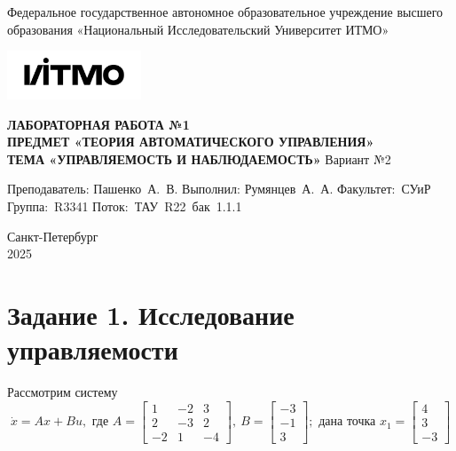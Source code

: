 \documentclass[a4paper, 12pt]{article}
\begin{document}
    \begin{titlepage}

        \begin{center}
        Федеральное государственное автономное образовательное учреждение высшего образования
        «Национальный Исследовательский Университет ИТМО»
        \vfill
        
        \includegraphics[width=0.3\textwidth]{itmo.png} %

        {\large\bf ЛАБОРАТОРНАЯ РАБОТА №1}\\
        {\large\bf ПРЕДМЕТ «ТЕОРИЯ АВТОМАТИЧЕСКОГО УПРАВЛЕНИЯ»}\\
        {\large\bf ТЕМА «УПРАВЛЯЕМОСТЬ И НАБЛЮДАЕМОСТЬ»}
        Вариант №2
        \vfill

        \begin{flushright}
            \begin{minipage}{.45\textwidth}
            {
                \hbox{Преподаватель:}
                \hbox{Пашенко А. В.}
                \hbox{}
                \hbox{Выполнил:}
                \hbox{Румянцев А. А.}
                \hbox{}
                \hbox{Факультет: СУиР}
                \hbox{Группа: R3341}
                \hbox{Поток: ТАУ R22 бак 1.1.1}
            }
            \end{minipage}
        \end{flushright}
        \vfill
  
        Санкт-Петербург\\
        2025
        \end{center}
    \end{titlepage}
    
    \tableofcontents

    \newpage
    \section{Задание 1. Исследование управляемости}
    Рассмотрим систему $$\dot{x}=Ax+Bu,\text{ где } A=\begin{bmatrix}
        1 &-2 &3\\
        2 &-3 &2\\
        -2 &1 &-4
    \end{bmatrix},\ B=\begin{bmatrix}
        -3\\
        -1\\
        3
    \end{bmatrix};\text{ дана точка } x_1=\begin{bmatrix}
        4\\
        3\\
        -3
    \end{bmatrix}$$
\end{document}
